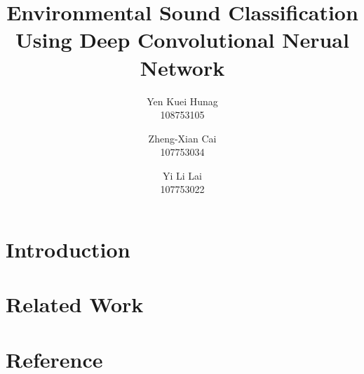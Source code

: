 \documentclass[11pt,oneside,a4paper]{article}
\title{\LARGE \bf
Environmental Sound Classification Using Deep Convolutional Nerual Network
}
\author{Yen Kuei Hunag \\ 108753105 \and  Zheng-Xian Cai \\ 107753034 \and Yi Li Lai \\ 107753022}
\date{\vspace{-5ex}}
\begin{document}
\maketitle

\begin{abstract}
    
\end{abstract}
\section{Introduction}
    
\section{Related Work}
    
\section{Reference}
    
\end{document}
